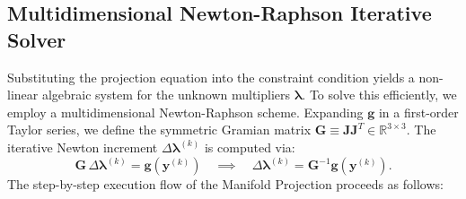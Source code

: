 \documentclass[11pt]{book}
\begin{document}
\subsection{Multidimensional Newton-Raphson Iterative Solver}
Substituting the projection equation into the constraint condition yields a non-linear algebraic system for the unknown multipliers \(\bm{\lambda}\). To solve this efficiently, we employ a multidimensional Newton-Raphson scheme. Expanding \(\bm{g}\) in a first-order Taylor series, we define the symmetric Gramian matrix \(\bm{G} \equiv \bm{J} \bm{J}^T \in \mathbb{R}^{3 \times 3}\). The iterative Newton increment \(\Delta \bm{\lambda}^{(k)}\) is computed via:
\begin{equation}
    \bm{G} \, \Delta \bm{\lambda}^{(k)} = \bm{g}(\bm{y}^{(k)}) \quad \implies \quad \Delta \bm{\lambda}^{(k)} = \bm{G}^{-1} \bm{g}(\bm{y}^{(k)}).
\end{equation}
The step-by-step execution flow of the Manifold Projection proceeds as follows:
\end{document}
